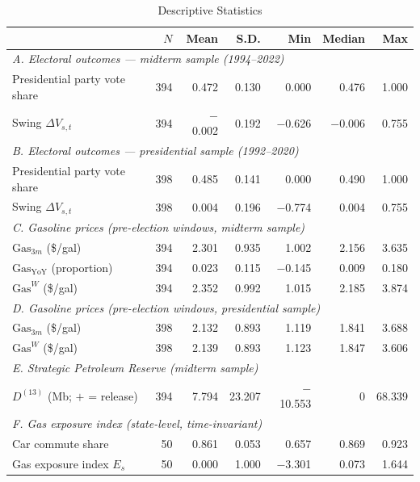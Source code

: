 \documentclass[12pt]{article}
\begin{document}
\begin{table}[!htbp]
\centering
\caption{Descriptive Statistics}
\label{tab:summary}
\begin{threeparttable}
\small
\begin{tabular}{lrrrrrr}
\toprule
 & $N$ & Mean & S.D. & Min & Median & Max \\
\midrule
\multicolumn{7}{l}{\textit{A. Electoral outcomes --- midterm sample (1994--2022)}} \\[2pt]
Presidential party vote share & 394 & 0.472 & 0.130 & 0.000 & 0.476 & 1.000 \\
Swing $\Delta V_{s,t}$ & 394 & $-$0.002 & 0.192 & $-$0.626 & $-$0.006 & 0.755 \\[4pt]
\multicolumn{7}{l}{\textit{B. Electoral outcomes --- presidential sample (1992--2020)}} \\[2pt]
Presidential party vote share & 398 & 0.485 & 0.141 & 0.000 & 0.490 & 1.000 \\
Swing $\Delta V_{s,t}$ & 398 & 0.004 & 0.196 & $-$0.774 & 0.004 & 0.755 \\[4pt]
\multicolumn{7}{l}{\textit{C. Gasoline prices (pre-election windows, midterm sample)}} \\[2pt]
$\mathrm{Gas}_{3m}$ (\$/gal) & 394 & 2.301 & 0.935 & 1.002 & 2.156 & 3.635 \\
$\mathrm{Gas}_{\mathrm{YoY}}$ (proportion) & 394 & 0.023 & 0.115 & $-$0.145 & 0.009 & 0.180 \\
$\mathrm{Gas}^W$ (\$/gal) & 394 & 2.352 & 0.992 & 1.015 & 2.185 & 3.874 \\[4pt]
\multicolumn{7}{l}{\textit{D. Gasoline prices (pre-election windows, presidential sample)}} \\[2pt]
$\mathrm{Gas}_{3m}$ (\$/gal) & 398 & 2.132 & 0.893 & 1.119 & 1.841 & 3.688 \\
$\mathrm{Gas}^W$ (\$/gal) & 398 & 2.139 & 0.893 & 1.123 & 1.847 & 3.606 \\[4pt]
\multicolumn{7}{l}{\textit{E. Strategic Petroleum Reserve (midterm sample)}} \\[2pt]
$D^{(13)}$ (Mb; $+$ = release) & 394 & 7.794 & 23.207 & $-$10.553 & 0 & 68.339 \\[4pt]
\multicolumn{7}{l}{\textit{F. Gas exposure index (state-level, time-invariant)}} \\[2pt]
Car commute share & 50 & 0.861 & 0.053 & 0.657 & 0.869 & 0.923 \\
Gas exposure index $E_s$ & 50 & 0.000 & 1.000 & $-$3.301 & 0.073 & 1.644 \\[4pt]

\end{tabular}
\end{threeparttable}
\end{table}
\end{document}
